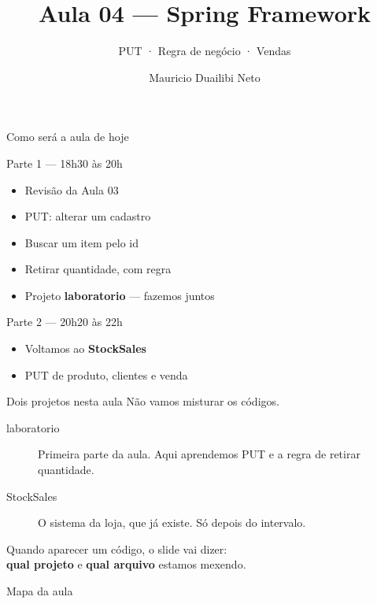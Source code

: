 \documentclass[aspectratio=169,11pt]{beamer}
\title{Aula 04 --- Spring Framework}
\subtitle{PUT · Regra de negócio · Vendas}
\author{Mauricio Duailibi Neto}
\institute{Turma Java Entra21}
\date{}
\begin{document}
\begin{frame}
  \titlepage
\end{frame}

\begin{frame}{Como será a aula de hoje}
  \begin{block}{Parte 1 --- 18h30 às 20h}
    \begin{itemize}
      \item Revisão da Aula 03
      \item PUT: alterar um cadastro
      \item Buscar um item pelo id
      \item Retirar quantidade, com regra
      \item Projeto \textbf{laboratorio} --- fazemos juntos
    \end{itemize}
  \end{block}

  \vspace{0.4em}
  \begin{block}{Parte 2 --- 20h20 às 22h}
    \begin{itemize}
      \item Voltamos ao \textbf{StockSales}
      \item PUT de produto, clientes e venda
    \end{itemize}
  \end{block}
\end{frame}

\begin{frame}{Dois projetos nesta aula}
  Não vamos misturar os códigos.

  \vspace{0.6em}
  \begin{description}
    \item[laboratorio] Primeira parte da aula.
      Aqui aprendemos PUT e a regra de retirar quantidade.
    \item[StockSales] O sistema da loja, que já existe.
      Só depois do intervalo.
  \end{description}

  \vspace{0.6em}
  Quando aparecer um código, o slide vai dizer:\\
  \textbf{qual projeto} e \textbf{qual arquivo} estamos mexendo.
\end{frame}

\begin{frame}{Mapa da aula}
  \tableofcontents
\end{frame}
\end{document}
